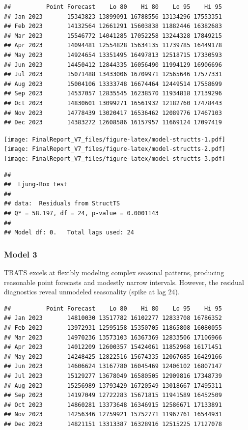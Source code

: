 \documentclass[
]{article}
\begin{document}
\begin{verbatim}
##          Point Forecast    Lo 80    Hi 80    Lo 95    Hi 95
## Jan 2023       15343823 13899091 16788556 13134296 17553351
## Feb 2023       14132564 12661291 15603838 11882446 16382683
## Mar 2023       15546772 14041285 17052258 13244328 17849215
## Apr 2023       14094481 12554828 15634135 11739785 16449178
## May 2023       14924654 13351495 16497813 12518715 17330593
## Jun 2023       14450412 12844335 16056490 11994129 16906696
## Jul 2023       15071488 13433006 16709971 12565646 17577331
## Aug 2023       15004106 13333748 16674464 12449514 17558699
## Sep 2023       14537057 12835545 16238570 11934818 17139296
## Oct 2023       14830601 13099271 16561932 12182760 17478443
## Nov 2023       14778439 13020417 16536462 12089776 17467103
## Dec 2023       14383272 12608586 16157957 11669124 17097419
\end{verbatim}

\texttt{[image: FinalReport\_V7\_files/figure-latex/model-structts-1.pdf]}
\texttt{[image: FinalReport\_V7\_files/figure-latex/model-structts-2.pdf]}
\texttt{[image: FinalReport\_V7\_files/figure-latex/model-structts-3.pdf]}

\begin{verbatim}
## 
##  Ljung-Box test
## 
## data:  Residuals from StructTS
## Q* = 58.197, df = 24, p-value = 0.0001143
## 
## Model df: 0.   Total lags used: 24
\end{verbatim}

\subsubsection{Model 3}\label{model-3}

TBATS excels at flexibly modeling complex seasonal patterns, producing
reasonable point forecasts and modestly narrow intervals. However, the
residual diagnostics reveal unmodeled seasonality (spike at lag 24).

\begin{verbatim}
##          Point Forecast    Lo 80    Hi 80    Lo 95    Hi 95
## Jan 2023       14810030 13517782 16102277 12833708 16786352
## Feb 2023       13972931 12595158 15350705 11865808 16080055
## Mar 2023       14970236 13573103 16367369 12833506 17106966
## Apr 2023       14012209 12600357 15424061 11852968 16171451
## May 2023       14248425 12822516 15674335 12067685 16429166
## Jun 2023       14606624 13167780 16045469 12406102 16807147
## Jul 2023       15129277 13678049 16580505 12909816 17348739
## Aug 2023       15256989 13793429 16720549 13018667 17495311
## Sep 2023       14197049 12722283 15671815 11941589 16452509
## Oct 2023       14860281 13373648 16346915 12586671 17133891
## Nov 2023       14256346 12759921 15752771 11967761 16544931
## Dec 2023       14821151 13313387 16328916 12515225 17127078
\end{verbatim}
\end{document}
